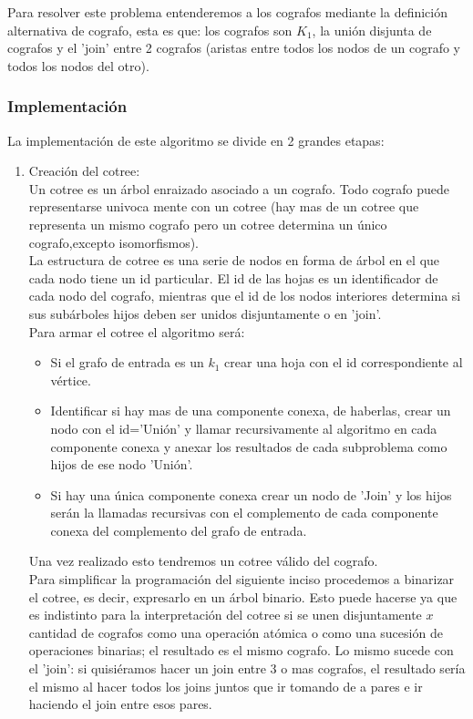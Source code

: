 \noindent Para resolver este problema entenderemos a los cografos mediante la definición alternativa de cografo, esta es que: los cografos son $K_1$, la unión disjunta de cografos y el 'join' entre 2 cografos (aristas entre todos los nodos de un cografo y todos los nodos del otro).
\subsubsection{Implementación}
La implementación de este algoritmo se divide en 2 grandes etapas:
\begin{enumerate}
\item Creación del cotree:\\
 Un cotree es un árbol enraizado asociado a un cografo. Todo cografo puede representarse univoca mente con un cotree (hay mas de un cotree que representa un mismo cografo pero un cotree determina un único cografo,excepto isomorfismos).\\
 La estructura de cotree es una serie de nodos en forma de árbol en el que cada nodo tiene un id particular. El id de las hojas es un identificador de cada nodo del cografo, mientras que el id de los nodos interiores determina si sus subárboles hijos deben ser unidos disjuntamente o en 'join'.\\
Para armar el cotree el algoritmo será:
\begin{itemize}
\item Si el grafo de entrada es un $k_1$ crear una hoja con el id correspondiente al vértice.
\item Identificar si hay mas de una componente conexa, de haberlas, crear un nodo con el id='Unión' y llamar recursivamente al algoritmo en cada componente conexa y anexar los resultados de cada subproblema como hijos de ese nodo 'Unión'.
\item Si hay una única componente conexa crear un nodo de 'Join' y los hijos serán la llamadas recursivas con el complemento de cada componente conexa del complemento del grafo de entrada.
\end{itemize}
Una vez realizado esto tendremos un cotree válido del cografo.\\
Para simplificar la programación del siguiente inciso procedemos a binarizar el cotree, es decir, expresarlo en un árbol binario. Esto puede hacerse ya que es indistinto para la interpretación del cotree si se unen disjuntamente $x$ cantidad de cografos como una operación atómica o como una sucesión de operaciones binarias; el resultado es el mismo cografo. Lo mismo sucede con el 'join': si quisiéramos hacer un join entre 3 o mas cografos, el resultado sería el mismo al hacer todos los joins juntos que ir tomando de a pares e ir haciendo el join entre esos pares.\\

\end{enumerate}
